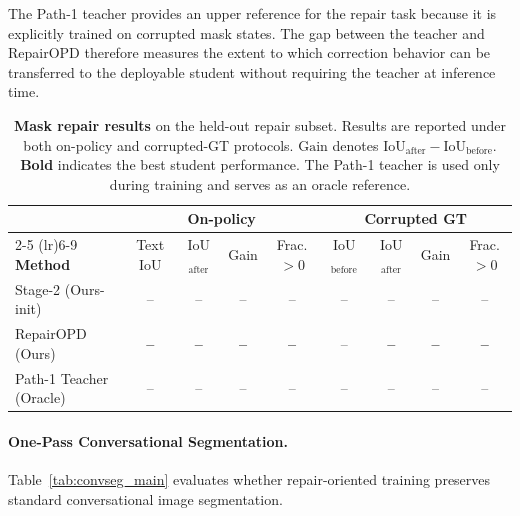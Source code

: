 The Path-1 teacher provides an upper reference for the repair task because it is explicitly trained on corrupted mask states.
The gap between the teacher and RepairOPD therefore measures the extent to which correction behavior can be transferred to the deployable student without requiring the teacher at inference time.


\begin{table}[t]
    \centering
    \caption{
    \textbf{Mask repair results} on the held-out repair subset.
    Results are reported under both on-policy and corrupted-GT protocols.
    $\mathrm{Gain}$ denotes $\mathrm{IoU}_{\mathrm{after}}-\mathrm{IoU}_{\mathrm{before}}$.
    \textbf{Bold} indicates the best student performance.
    The Path-1 teacher is used only during training and serves as an oracle reference.
    }
    \label{tab:repair_main}
    \small
    \setlength{\tabcolsep}{5pt}
    \begin{tabular}{l cc cc cc cc}
        \toprule
        & \multicolumn{4}{c}{\textbf{On-policy}} &
        \multicolumn{4}{c}{\textbf{Corrupted GT}} \\
        \cmidrule(lr){2-5}
        \cmidrule(lr){6-9}
        \textbf{Method}
        & Text IoU
        & IoU$_{\mathrm{after}}$
        & Gain
        & Frac.$\!>\!0$
        & IoU$_{\mathrm{before}}$
        & IoU$_{\mathrm{after}}$
        & Gain
        & Frac.$\!>\!0$ \\
        \midrule
        Stage-2 (Ours-init)
        & --
        & --
        & --
        & --
        & --
        & --
        & --
        & -- \\

        RepairOPD (Ours)
        & \textbf{--}
        & \textbf{--}
        & \textbf{--}
        & \textbf{--}
        & --
        & \textbf{--}
        & \textbf{--}
        & \textbf{--} \\

        Path-1 Teacher (Oracle)
        & --
        & --
        & --
        & --
        & --
        & --
        & --
        & -- \\
        \bottomrule
    \end{tabular}
\end{table}


\paragraph{One-Pass Conversational Segmentation.}
Table~\ref{tab:convseg_main} evaluates whether repair-oriented training preserves standard conversational image segmentation.

